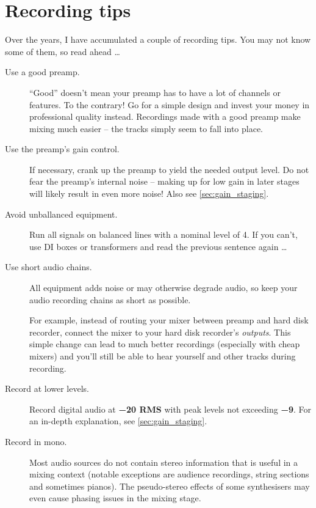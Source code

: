 \chapter{Recording tips}
\label{chap:recording_tips}

Over the years, I have accumulated a couple of recording tips.  You
may not know some of them, so read ahead \dots

\begin{description}

\item[Use a good preamp.]  ``Good'' doesn't mean your preamp has to
  have a lot of channels or features.  To the contrary!  Go for a
  simple design and invest your money in professional quality instead.
  Recordings made with a good preamp make mixing much easier -- the
  tracks simply seem to fall into place.

\item[ Use the preamp's gain control.]  If necessary, crank up the
  preamp to yield the needed output level.  Do not fear the preamp's
  internal noise -- making up for low gain in later stages will likely
  result in even more noise!  Also see \ref{sec:gain_staging}.

\item[Avoid unballanced equipment.]  Run all signals on balanced lines
  with a nominal level of \SI[retain-explicit-plus]{+4}{\dBu}.  If you
  can't, use DI boxes or transformers and read the previous sentence
  again \dots

\item[Use short audio chains.]  All equipment adds noise or may
  otherwise degrade audio, so keep your audio recording chains as
  short as possible.

  For example, instead of routing your mixer between preamp and hard
  disk recorder, connect the mixer to your hard disk recorder's
  \emph{outputs}.  This simple change can lead to much better
  recordings (especially with cheap mixers) and you'll still be able
  to hear yourself and other tracks during recording.

\item[Record at lower levels.]  Record digital audio at
  \textbf{\SI{-20}{\dBFS} RMS} with peak levels not exceeding
  \textbf{\SI{-9}{\dBFS}}.  For an in-depth explanation, see
  \ref{sec:gain_staging}.

\item[Record in mono.]  Most audio sources do not contain stereo
  information that is useful in a mixing context (notable exceptions
  are audience recordings, string sections and sometimes pianos).  The
  pseudo-stereo effects of some synthesisers may even cause phasing
  issues in the mixing stage.


\end{description}
